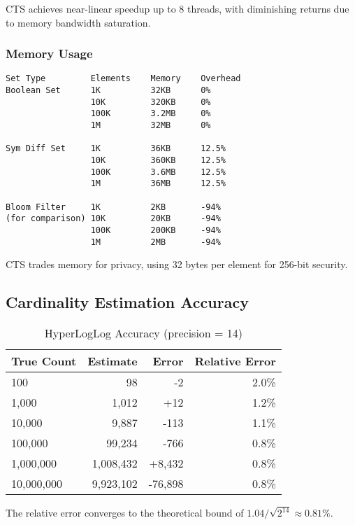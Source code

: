 \documentclass[../main_comprehensive.tex]{subfiles}
\begin{document}
CTS achieves near-linear speedup up to 8 threads, with diminishing returns due to memory bandwidth saturation.

\subsubsection{Memory Usage}

\begin{lstlisting}[language={},basicstyle=\scriptsize\ttfamily,frame=single,caption={Memory usage for different set types}]
Set Type         Elements    Memory    Overhead
Boolean Set      1K          32KB      0%
                 10K         320KB     0%
                 100K        3.2MB     0%
                 1M          32MB      0%

Sym Diff Set     1K          36KB      12.5%
                 10K         360KB     12.5%
                 100K        3.6MB     12.5%
                 1M          36MB      12.5%

Bloom Filter     1K          2KB       -94%
(for comparison) 10K         20KB      -94%
                 100K        200KB     -94%
                 1M          2MB       -94%
\end{lstlisting}

CTS trades memory for privacy, using 32 bytes per element for 256-bit security.

\subsection{Cardinality Estimation Accuracy}

\begin{table}[h]
\centering
\caption{HyperLogLog Accuracy (precision = 14)}
\begin{tabular}{lrrr}
\toprule
True Count & Estimate & Error & Relative Error \\
\midrule
100 & 98 & -2 & 2.0\% \\
1,000 & 1,012 & +12 & 1.2\% \\
10,000 & 9,887 & -113 & 1.1\% \\
100,000 & 99,234 & -766 & 0.8\% \\
1,000,000 & 1,008,432 & +8,432 & 0.8\% \\
10,000,000 & 9,923,102 & -76,898 & 0.8\% \\
\bottomrule
\end{tabular}
\end{table}

The relative error converges to the theoretical bound of $1.04/\sqrt{2^{14}} \approx 0.81\%$.
\end{document}
